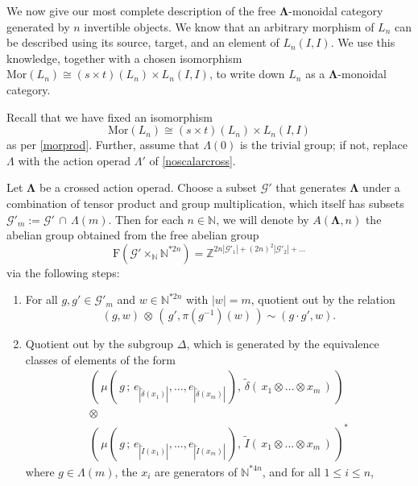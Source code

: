 \documentclass{amsbook} %
\newcommand{\ML}{\mathbf{\Lambda}}
\newcommand{\MorLn}{\mathrm{Mor}(L_n)}
\newcommand{\LL}{\Lambda}
\numberwithin{section}{chapter}
\begin{document}
We now give our most complete description of the free $\ML$-monoidal category generated by $n$ invertible objects. We know that an arbitrary morphism of $L_n$ can be described using its source, target, and an element of $L_n(I,I)$. We use this knowledge, together with a chosen isomorphism $\MorLn \cong (s \times t)(L_n) \times L_n(I,I)$, to write down $L_n$ as a $\ML$-monoidal category.

\begin{conv}
Recall that we have fixed an isomorphism 
  \[
    \MorLn \cong (s \times t)(L_n) \times L_n(I,I)
  \]
 as per \cref{morprod}. Further, assume that $\Lambda(0)$ is the trivial group; if not, replace $\Lambda$ with the action operad $\Lambda'$ of \cref{noscalarcross}.
\end{conv}

\begin{Defi} \label{AGndef} Let $\ML$ be a crossed action operad. Choose a subset $\mathcal{G}'$ that generates $\ML$ under a combination of tensor product and group multiplication, which itself has subsets $\mathcal{G}'_m := \mathcal{G}' \, \cap \, \Lambda(m)$. Then for each $n \in \mathbb{N}$, we will denote by $A(\ML,n)$ the abelian group obtained from the free abelian group 
  \[
    \mathrm{F}\left( \mathcal{G}' \times_{\mathbb{N}} \mathbb{N}^{\ast 2n}\right) = \mathbb{Z}^{2n|\mathcal{G}'_1| + (2n)^2|\mathcal{G}'_2| + \ldots}
  \]
via the following steps:
\begin{enumerate}
\item For all $g, g' \in \mathcal{G}'_m$ and $w \in \mathbb{N}^{\ast 2n}$ with $|w| = m$, quotient out by the relation 
  \[
    (g, w) \, \otimes \, \left( \, g', \pi(g^{-1})(w) \, \right) \sim (g \cdot g', w).
  \]
\item Quotient out by the subgroup $\Delta$, which is generated by the equivalence classes of elements of the form
  \[
    \begin{array}{c}
  		\left( \, \mu( \, g \, ; \, e_{|\tilde{\delta}(x_1)|}, \ldots, e_{|\tilde{\delta}(x_m)|} \, ), \, \tilde{\delta}( \, x_1 \otimes \ldots \otimes x_m \, ) \, \right) \\
  		\otimes \\
  		\left( \, \mu( \, g \, ; \, e_{|\tilde{I}(x_1)|}, \ldots, e_{|\tilde{I}(x_m)|} \, ), \, \tilde{I}( \, x_1 \otimes \ldots \otimes x_m \, ) \, \right)^*
  	\end{array} 
  \]
where $g \in \LL(m)$, the $x_i$ are generators of $\mathbb{N}^{\ast 4n}$, and for all $1 \le i \le n$,
  \[
    \begin{array}{ll}

\end{array}\]
\end{enumerate}
\end{Defi}
\end{document}
